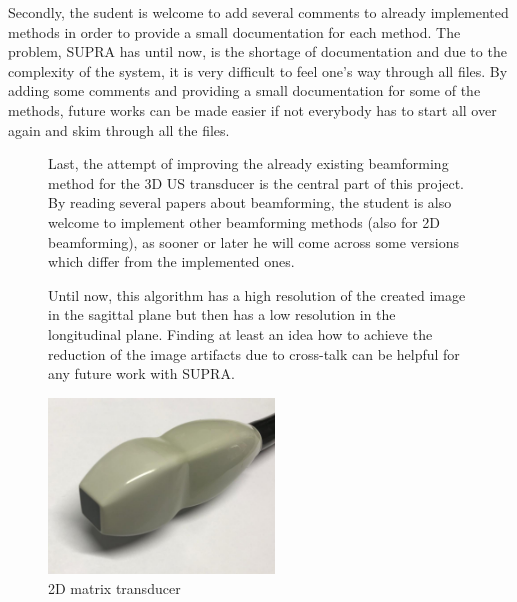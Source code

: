 \documentclass[12pt,a4paper,oneside]{scrartcl}
\begin{document}
Secondly, the sudent is welcome to add several comments to already implemented methods in order to provide a small documentation for each method.
The problem, SUPRA has until now, is the shortage of documentation and due to the complexity of the system, it is very difficult to feel one's way through all files.
By adding some comments and providing a small documentation for some of the methods, future works can be made easier if not everybody has to start all over again and skim through all the files.



\begin{figure}[htbp]
\begin{minipage}[t]{0.6 \textwidth}
\vspace{0pt}
Last, the attempt of improving the already existing beamforming method for the 3D US transducer is the central part of this project.
By reading several papers about beamforming, the student is also welcome to implement other beamforming methods (also for 2D beamforming), as sooner or later he will come across some versions which differ from the implemented ones.

Until now, this algorithm has a high resolution of the created image in the sagittal plane but then has a low resolution in the longitudinal plane.
Finding at least an idea how to achieve the reduction of the image artifacts due to cross-talk can be helpful for any future work with SUPRA.
\end{minipage}
\begin{minipage}[t]{20mm}
\end{minipage}
\begin{minipage}[t]{6cm}
\vspace{0pt}
\centering
\includegraphics[width = 6cm]{Bilder/transducer.png}
\caption[Transducer]{2D matrix transducer}
\label{fig:transducer}
\end{minipage}
\end{figure}
\end{document}
